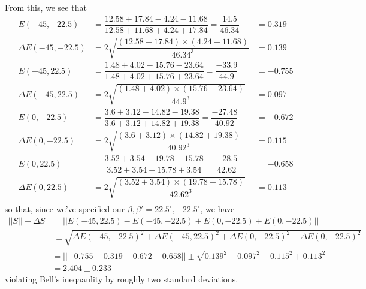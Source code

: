 \documentclass[10pt,a4paper]{article}
\begin{document}
\noindent From this, we see that
\begin{align*}
E(-45, -22.5) &= \dfrac{12.58 + 17.84 - 4.24 - 11.68}{12.58 + 11.68 + 4.24 + 17.84} = \dfrac{14.5}{46.34} &= 0.319\\
\Delta E(-45, -22.5) &= 2\sqrt{\dfrac{(12.58 + 17.84)\times(4.24 + 11.68)}{46.34^{3}}} &= 0.139\\
E(-45, 22.5) &= \dfrac{1.48 + 4.02 - 15.76 - 23.64}{1.48 + 4.02 + 15.76 + 23.64} = \dfrac{-33.9}{44.9} &= -0.755\\
\Delta E(-45, 22.5) &= 2\sqrt{\dfrac{(1.48 + 4.02)\times(15.76 + 23.64)}{44.9^{3}}} &= 0.097\\
E(0,-22.5) &= \dfrac{3.6 + 3.12 - 14.82 - 19.38}{3.6 + 3.12 + 14.82 + 19.38} = \dfrac{-27.48}{40.92} &= -0.672\\
\Delta E(0, -22.5) &= 2\sqrt{\dfrac{(3.6 + 3.12)\times(14.82 + 19.38)}{40.92^{3}}} &= 0.115\\
E(0,22.5) &= \dfrac{3.52 + 3.54 - 19.78 - 15.78}{3.52 + 3.54 + 15.78 + 3.54} = \dfrac{-28.5}{42.62} &= -0.658\\
\Delta E(0,22.5) &= 2\sqrt{\dfrac{(3.52 + 3.54)\times(19.78 + 15.78)}{42.62^{3}}} &= 0.113\\
\end{align*}
\noindent so that, since we've specified our $\beta,\beta' = 22.5^{\circ}, -22.5^{\circ}$, we have
\begin{align*}
\lvert| S \rvert| + \Delta S &= \lvert|E(-45, 22.5) - E(-45, -22.5) + E(0,-22.5) + E(0,-22.5)\rvert|\\
&\;\pm \sqrt{\Delta E(-45, -22.5)^{2} + \Delta E(-45, 22.5)^{2} + \Delta E(0,-22.5)^{2} + \Delta E(0,-22.5)^{2}}\\
&= \lvert|-0.755 - 0.319 - 0.672 - 0.658 \rvert| \pm \sqrt{0.139^{2} + 0.097^{2} + 0.115^{2} + 0.113^{2}}\\
&= 2.404 \pm 0.233
\end{align*}
\noindent violating Bell's ineqaaulity by roughly two standard deviations.
\end{document}
